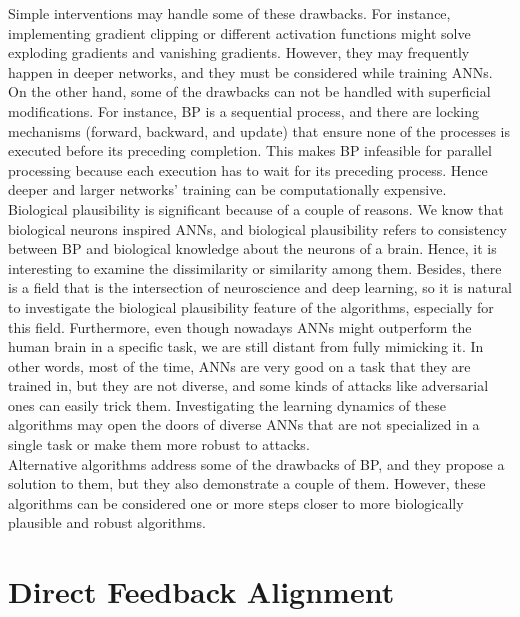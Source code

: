 \documentclass[a4paper, nobind]{templates/ociamthesis}
\begin{document}
\noindent Simple interventions may handle some of these drawbacks. For instance, implementing gradient clipping or different activation functions might solve exploding gradients and vanishing gradients. However, they may frequently happen in deeper networks, and they must be considered while training ANNs. On the other hand, some of the drawbacks can not be handled with superficial modifications. For instance, BP is a sequential process, and there are locking mechanisms (forward, backward, and update) that ensure none of the processes is executed before its preceding completion. This makes BP infeasible for parallel processing because each execution has to wait for its preceding process. Hence deeper and larger networks' training can be computationally expensive.\\
Biological plausibility is significant because of a couple of reasons. We know that biological neurons inspired ANNs, and biological plausibility refers to consistency between BP and biological knowledge about the neurons of a brain. Hence, it is interesting to examine the dissimilarity or similarity among them. Besides, there is a field that is the intersection of neuroscience and deep learning, so it is natural to investigate the biological plausibility feature of the algorithms, especially for this field. Furthermore, even though nowadays ANNs might outperform the human brain in a specific task, we are still distant from fully mimicking it. In other words, most of the time, ANNs are very good on a task that they are trained in, but they are not diverse, and some kinds of attacks like adversarial ones can easily trick them. Investigating the learning dynamics of these algorithms may open the doors of diverse ANNs that are not specialized in a single task or make them more robust to attacks.\\
Alternative algorithms address some of the drawbacks of BP, and they propose a solution to them, but they also demonstrate a couple of them. However, these algorithms can be considered one or more steps closer to more biologically plausible and robust algorithms.

\hypertarget{direct-feedback-alignment}{%
\section{Direct Feedback Alignment}\label{direct-feedback-alignment}}
\end{document}
